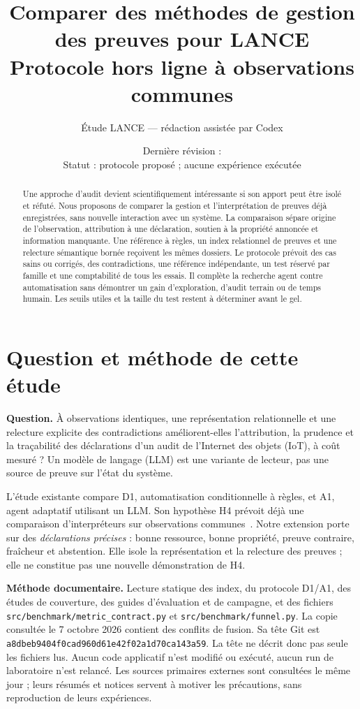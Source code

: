 \documentclass[11pt,a4paper]{article}
\title{Comparer des méthodes de gestion des preuves pour LANCE\\
  \large Protocole hors ligne à observations communes}
\author{Étude LANCE --- rédaction assistée par Codex}
\date{Dernière révision : \revision\\
  \small Statut : protocole proposé ; aucune expérience exécutée}
\newcommand{\fichier}[1]{\nolinkurl{#1}}
\begin{document}
\maketitle
\begin{abstract}
Une approche d'audit devient scientifiquement intéressante si son apport peut
être isolé et réfuté. Nous proposons de comparer la gestion et l'interprétation
de preuves déjà enregistrées, sans nouvelle interaction avec un système.
La comparaison sépare origine de l'observation, attribution à une déclaration,
soutien à la propriété annoncée et information manquante. Une référence à
règles, un index relationnel de preuves et une relecture sémantique bornée
reçoivent les mêmes dossiers. Le protocole prévoit des cas sains ou corrigés,
des contradictions, une référence indépendante, un test réservé par famille et
une comptabilité de tous les essais. Il complète la recherche agent contre
automatisation sans démontrer un gain d'exploration, d'audit terrain ou de temps
humain. Les seuils utiles et la taille du test restent à déterminer avant le gel.
\end{abstract}
\tableofcontents

\section{Question et méthode de cette étude}
\label{sec:scope}
\textbf{Question.} À observations identiques, une représentation relationnelle
et une relecture explicite des contradictions améliorent-elles l'attribution,
la prudence et la traçabilité des déclarations d'un audit de l'Internet des objets
(IoT), à coût mesuré ? Un modèle de langage (LLM) est une variante de lecteur,
pas une source de preuve sur l'état du système.

L'étude existante compare D1, automatisation conditionnelle à règles, et A1,
agent adaptatif utilisant un LLM. Son hypothèse H4 prévoit déjà une comparaison
d'interpréteurs sur observations communes~\cite{local-policy}. Notre extension
porte sur des \emph{déclarations précises} : bonne ressource, bonne propriété,
preuve contraire, fraîcheur et abstention. Elle isole la représentation et la
relecture des preuves ; elle ne constitue pas une nouvelle démonstration de H4.

\textbf{Méthode documentaire.} Lecture statique des index, du protocole D1/A1,
des études de couverture, des guides d'évaluation et de campagne, et des fichiers
\fichier{src/benchmark/metric_contract.py} et \fichier{src/benchmark/funnel.py}.
La copie consultée le 7 octobre 2026 contient des conflits de fusion. Sa tête Git
est \fichier{a8dbeb9404f0cad960d61e42f02a1d70ca143a59}.
La tête ne décrit donc pas seule les fichiers lus. Aucun code applicatif n'est
modifié ou exécuté, aucun run de laboratoire n'est relancé. Les sources primaires
externes sont consultées le même jour ; leurs résumés et notices servent à
motiver les précautions, sans reproduction de leurs expériences.
\end{document}
